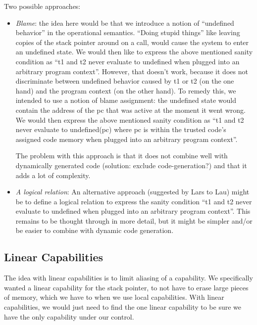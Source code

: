 \documentclass[a4paper]{article}
\begin{document}
Two possible approaches:
\begin{itemize}
\item \emph{Blame}: the idea here would be that we introduce a notion of ``undefined behavior'' in the operational semantics.
  ``Doing stupid things'' like leaving copies of the stack pointer around on a call, would cause the system to enter an undefined state.
  We would then like to express the above mentioned sanity condition as ``t1 and t2 never evaluate to undefined when plugged into an arbitrary program context''.
  However, that doesn't work, because it does not discriminate between undefined behavior caused by t1 or t2 (on the one hand) and the program context (on the other hand).
  To remedy this, we intended to use a notion of blame assignment: the undefined state would contain the address of the pc that was active at the moment it went wrong.
  We would then express the above mentioned sanity condition as ``t1 and t2 never evaluate to undefined(pc) where pc is within the trusted code's assigned code memory when plugged into an arbitrary program context''.

  The problem with this approach is that it does not combine well with dynamically generated code (solution: exclude code-generation?) and that it adds a lot of complexity.

\item \emph{A logical relation}: An alternative approach (suggested by Lars to Lau) might be to define a logical relation to express the sanity condition ``t1 and t2 never evaluate to undefined when plugged into an arbitrary program context''.
  This remains to be thought through in more detail, but it might be simpler and/or be easier to combine with dynamic code generation.
\end{itemize}

\subsection{Linear Capabilities}
\label{sec:linear-cap}
The idea with linear capabilities is to limit aliasing of a capability. We specifically wanted a linear capability for the stack pointer, to not have to erase large pieces of memory, which we have to when we use local capabilities. With linear capabilities, we would just need to find the one linear capability to be sure we have the only capability under our control.
\end{document}
